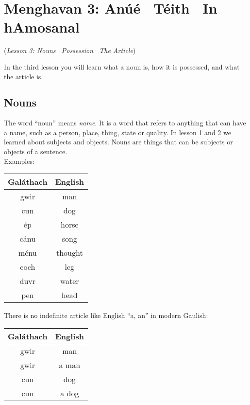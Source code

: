 \section{Menghavan 3: An\'{u}\'{e} \textendash\ T\'{e}ith \textendash\ In hAmosanal}
(\textit{Lesson 3: Nouns \textendash\ Possession \textendash\ The Article})

\noindent In the third lesson you will learn what a noun is, how it is possessed, and what the article is.\\

\subsection{Nouns}

\noindent The word ``noun'' means \textit{name}. It is a word that refers to anything that can have a name, such as a person, place, thing, state or quality. In lesson 1 and 2 we learned about subjects and objects. Nouns are things that can be subjects or objects of a sentence.\\

\noindent Examples:
\begin{table}[H]
\centering
\begin{tabu}{c|c}
  \textbf{Gal\'{a}thach} & \textbf{English}\\
  \toprule
  gwir & man\\
  cun & dog\\
  \'{e}p & horse\\
  c\'{a}nu & song\\
  m\'{e}nu & thought\\
  coch & leg\\
  duvr & water\\
  pen & head
\end{tabu}
\label{examples_nouns}
\end{table}

\noindent There is no indefinite article like English ``a, an'' in modern Gaulish:
\begin{table}[H]
\centering
\begin{tabu}{c|c}
  \textbf{Gal\'{a}thach} & \textbf{English}\\
  \toprule
  gwir & man\\
  gwir & a man\\
  cun & dog\\
  cun & a dog
\end{tabu}
\label{examples_no_indefinite_article}
\end{table}


